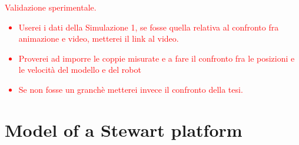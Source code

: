 \documentclass[]{interact}
\theoremstyle{plain}%
\theoremstyle{definition}
\theoremstyle{remark}
\begin{document}
\textcolor{red}{
Validazione sperimentale.
\begin{itemize}
  \item Userei i dati della Simulazione 1, se fosse quella relativa al confronto fra animazione e video, metterei il link al video.
  \item Proverei ad imporre le coppie misurate e a fare il confronto fra le posizioni e le velocit\`{a} del modello e del robot
  \item Se non fosse un granch\`{e} metterei invece il confronto della tesi.
\end{itemize}
}

\section{Model of a Stewart platform}
\label{Sec:Stewart_platform_model}
\end{document}
